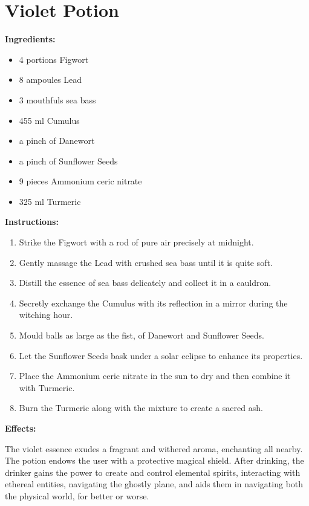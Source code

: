 \documentclass{article}
\begin{document}
\newpage
\section*{Violet Potion}

\textbf{Ingredients:}

\begin{itemize}
  \item 4 portions Figwort
  \item 8 ampoules Lead
  \item 3 mouthfuls sea ​​bass
  \item 455 ml Cumulus
  \item a pinch of Danewort
  \item a pinch of Sunflower Seeds
  \item 9 pieces Ammonium ceric nitrate
  \item 325 ml Turmeric
\end{itemize}

\textbf{Instructions:}

\begin{enumerate}
  \item Strike the Figwort with a rod of pure air precisely at midnight.
  \item Gently massage the Lead with crushed sea ​​bass until it is quite soft.
  \item Distill the essence of sea ​​bass delicately and collect it in a cauldron.
  \item Secretly exchange the Cumulus with its reflection in a mirror during the witching hour.
  \item Mould balls as large as the fist, of Danewort and Sunflower Seeds.
  \item Let the Sunflower Seeds bask under a solar eclipse to enhance its properties.
  \item Place the Ammonium ceric nitrate in the sun to dry and then combine it with Turmeric.
  \item Burn the Turmeric along with the mixture to create a sacred ash.
\end{enumerate}

\textbf{Effects:}

The violet essence exudes a fragrant and withered aroma, enchanting all nearby. The potion endows the user with a protective magical shield. After drinking, the drinker gains the power to create and control elemental spirits, interacting with ethereal entities, navigating the ghostly plane, and aids them in navigating both the physical world, for better or worse.
\end{document}
